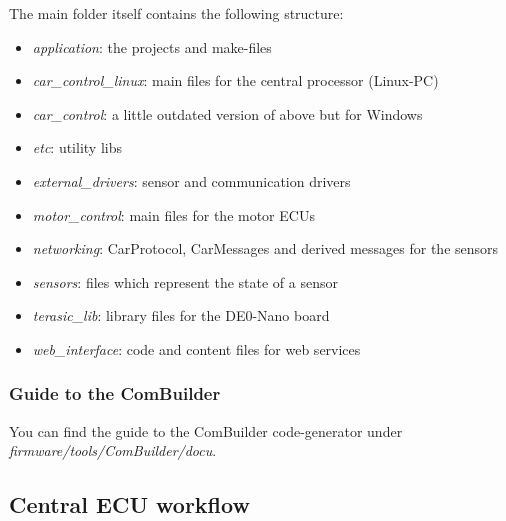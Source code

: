 The main folder itself contains the following structure:
\begin{itemize}
	\item \textit{application}: the projects and make-files
	\item \textit{car\_control\_linux}: main files for the central processor (Linux-PC)
	\item \textit{car\_control}: a little outdated version of above but for Windows
	\item \textit{etc}: utility libs
	\item \textit{external\_drivers}: sensor and communication drivers
	\item \textit{motor\_control}: main files for the motor ECUs
	\item \textit{networking}: CarProtocol, CarMessages and derived messages for the sensors
	\item \textit{sensors}: files which represent the state of a sensor
	\item \textit{terasic\_lib}: library files for the DE0-Nano board
	\item \textit{web\_interface}: code and content files for web services\\
\end{itemize}

\subsubsection{Guide to the ComBuilder}

You can find the guide to the ComBuilder code-generator under \textit{firmware/tools/ComBuilder/docu}.

\subsection{Central ECU workflow} 


